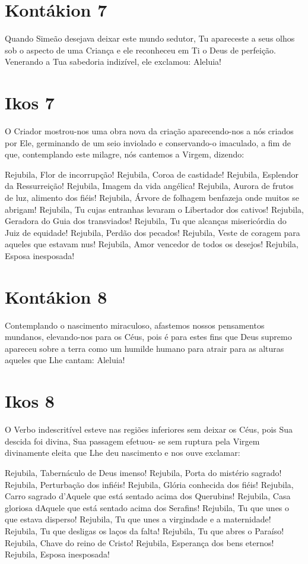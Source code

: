 \documentclass{subfiles}
\begin{document}
\section*{Kontákion 7}

Quando Simeão desejava deixar este mundo sedutor, Tu apareceste a
seus olhos sob o aspecto de uma Criança e ele reconheceu em Ti o Deus de
perfeição. Venerando a Tua sabedoria indizível, ele exclamou: Aleluia!

\section*{Ikos 7}

O Criador mostrou-nos uma obra nova da criação aparecendo-nos a
nós criados por Ele, germinando de um seio inviolado e conservando-o
imaculado, a fim de que, contemplando este milagre, nós cantemos a Virgem,
dizendo:

Rejubila, Flor de incorrupção!
Rejubila, Coroa de castidade!
Rejubila, Esplendor da Ressurreição!
Rejubila, Imagem da vida angélica!
Rejubila, Aurora de frutos de luz, alimento dos fiéis!
Rejubila, Árvore de folhagem benfazeja onde muitos se abrigam!
Rejubila, Tu cujas entranhas levaram o Libertador dos cativos!
Rejubila, Geradora do Guia dos transviados!
Rejubila, Tu que alcanças misericórdia do Juiz de equidade!
Rejubila, Perdão dos pecados!
Rejubila, Veste de coragem para aqueles que estavam nus!
Rejubila, Amor vencedor de todos os desejos!
Rejubila, Esposa inesposada!

\section*{Kontákion 8}

Contemplando o nascimento miraculoso, afastemos nossos
pensamentos mundanos, elevando-nos para os Céus, pois é para estes fins que
Deus supremo apareceu sobre a terra como um humilde humano para atrair
para as alturas aqueles que Lhe cantam: Aleluia!

\section*{Ikos 8}

O Verbo indescritível esteve nas regiões inferiores sem deixar os Céus,
pois Sua descida foi divina, Sua passagem efetuou- se sem ruptura pela Virgem
divinamente eleita que Lhe deu nascimento e nos ouve exclamar:

Rejubila, Tabernáculo de Deus imenso!
Rejubila, Porta do mistério sagrado!
Rejubila, Perturbação dos infiéis!
Rejubila, Glória conhecida dos fiéis!
Rejubila, Carro sagrado d'Aquele que está sentado acima dos Querubins!
Rejubila, Casa gloriosa dAquele que está sentado acima dos Serafins!
Rejubila, Tu que unes o que estava disperso!
Rejubila, Tu que unes a virgindade e a maternidade!
Rejubila, Tu que desligas os laços da falta!
Rejubila, Tu que abres o Paraíso!
Rejubila, Chave do reino de Cristo!
Rejubila, Esperança dos bens eternos!
Rejubila, Esposa inesposada!
\end{document}
